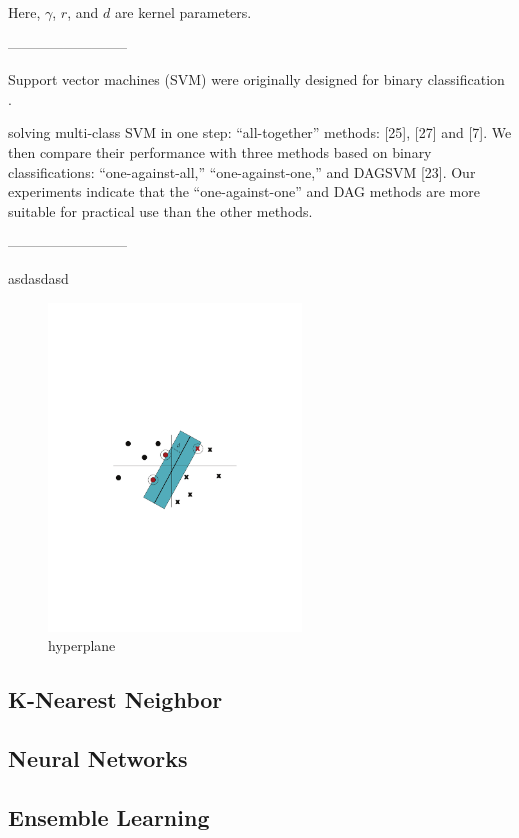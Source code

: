 Here, $\gamma$, $r$, and $d$ are kernel parameters.

--------------------------

Support vector machines (SVM) were originally designed for binary classification \cite{hsu2002comparison}.

solving multi-class SVM in one step: “all-together” methods: [25], [27] and [7]. We then compare their performance with three methods based on binary classifications: “one-against-all,” “one-against-one,” and DAGSVM [23]. Our experiments indicate that the “one-against-one” and DAG methods are more suitable for practical use than the other methods. 

--------------------------

asdasdasd \cite{berwick2003idiot}

\begin{figure}[!htp]
  \center
  \includegraphics[width=0.6\textwidth]{figures/hyperplane}
  \caption{hyperplane}
  \label{fig:hyperplane}
\end{figure}

\subsection{K-Nearest Neighbor}

\subsection{Neural Networks}

\subsection{Ensemble Learning}
\label{subsec:ensemble_learning]}

